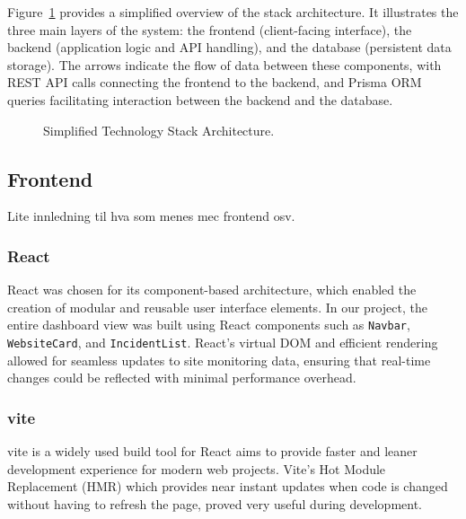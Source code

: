Figure~\ref{fig:tech_stack}  provides a simplified overview of the stack architecture. It illustrates the three main layers of the system: the frontend (client-facing interface), the backend (application logic and API handling), and the database (persistent data storage). The arrows indicate the flow of data between these components, with REST API calls connecting the frontend to the backend, and Prisma ORM queries facilitating interaction between the backend and the database.


\begin{figure}[H]
    \centering
    \caption{Simplified Technology Stack Architecture.}
    \label{fig:tech_stack}
\end{figure}


\subsection{Frontend}
Lite innledning til hva som menes mec frontend osv.


\subsubsection{React}
React was chosen for its component-based architecture, which enabled the creation of modular and reusable user interface elements. In our project, the entire dashboard view was built using React components such as \texttt{Navbar}, \texttt{WebsiteCard}, and \texttt{IncidentList}. React’s virtual DOM and efficient rendering allowed for seamless updates to site monitoring data, ensuring that real-time changes could be reflected with minimal performance overhead.

\subsubsection{\gls{vite}}
\gls{vite} is a widely used build tool for React aims to provide faster and leaner development experience for modern web projects.\autocite{viteGuide} Vite's Hot Module Replacement (HMR) which provides near instant updates when code is changed without having to refresh the page, proved very useful during development.

